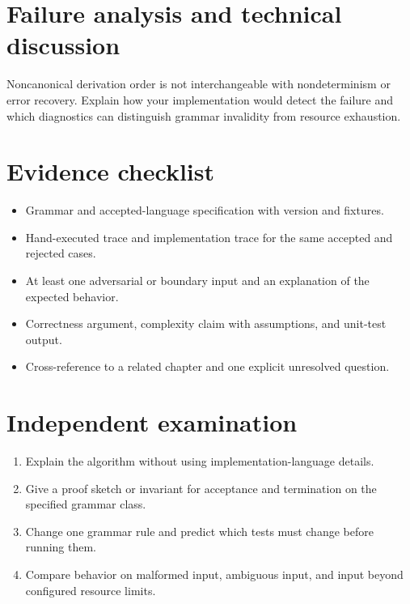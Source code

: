 \documentclass[11pt,letterpaper]{article}
\begin{document}
\section{Failure analysis and technical discussion}
Noncanonical derivation order is not interchangeable with nondeterminism or error recovery. Explain how your implementation would detect the failure and which diagnostics can distinguish grammar invalidity from resource exhaustion.
\section{Evidence checklist}
\begin{itemize}
\item Grammar and accepted-language specification with version and fixtures.
\item Hand-executed trace and implementation trace for the same accepted and rejected cases.
\item At least one adversarial or boundary input and an explanation of the expected behavior.
\item Correctness argument, complexity claim with assumptions, and unit-test output.
\item Cross-reference to a related chapter and one explicit unresolved question.
\end{itemize}
\section{Independent examination}
\begin{enumerate}
\item Explain the algorithm without using implementation-language details.
\item Give a proof sketch or invariant for acceptance and termination on the specified grammar class.
\item Change one grammar rule and predict which tests must change before running them.
\item Compare behavior on malformed input, ambiguous input, and input beyond configured resource limits.
\end{enumerate}
\end{document}
